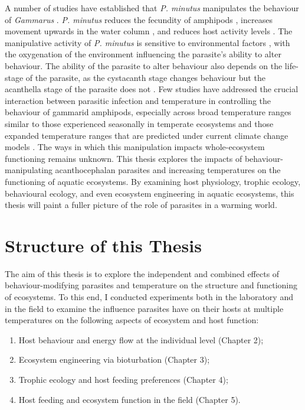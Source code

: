 A number of studies have established that \emph{P. minutus} manipulates the behaviour of \emph{Gammarus} \citep{kaldonski2008, perrot2016}. \emph{P. minutus} reduces the fecundity of amphipods \citep{dezfuli1999}, increases movement upwards in the water column \citep{perrot2016}, and reduces host activity levels \citep{jacquin2014}. The manipulative activity of \emph{P. minutus} is sensitive to environmental factors \citep{perrot2016}, with the oxygenation of the environment influencing the parasite’s ability to alter behaviour. The ability of the parasite to alter behaviour also depends on the life-stage of the parasite, as the cystacanth stage changes behaviour but the acanthella stage of the parasite does not \citep{bailly2017}. Few studies have addressed the crucial interaction between parasitic infection and temperature in controlling the behaviour of gammarid amphipods, especially across broad temperature ranges similar to those experienced seasonally in temperate ecosystems and those expanded temperature ranges that are predicted under current climate change models \citep{labaude2016, labaude2017}. The ways in which this manipulation impacts whole-ecosystem functioning remains unknown. This thesis explores the impacts of behaviour-manipulating acanthocephalan parasites and increasing temperatures on the functioning of aquatic ecosystems. By examining host physiology, trophic ecology, behavioural ecology, and even ecosystem engineering in aquatic ecosystems, this thesis will paint a fuller picture of the role of parasites in a warming world. 

\section{Structure of this Thesis}

The aim of this thesis is to explore the independent and combined effects of behaviour-modifying parasites and temperature on the structure and functioning of ecosystems. To this end, I conducted experiments both in the laboratory and in the field to examine the influence parasites have on their hosts at multiple temperatures on the following aspects of ecosystem and host function: 

\begin{enumerate}
\item	Host behaviour and energy flow at the individual level (Chapter 2); 
\item	Ecosystem engineering via bioturbation  (Chapter 3); 
\item	Trophic ecology and host feeding preferences  (Chapter 4); 
\item	Host feeding and ecosystem function in the field (Chapter 5).
\end{enumerate}

